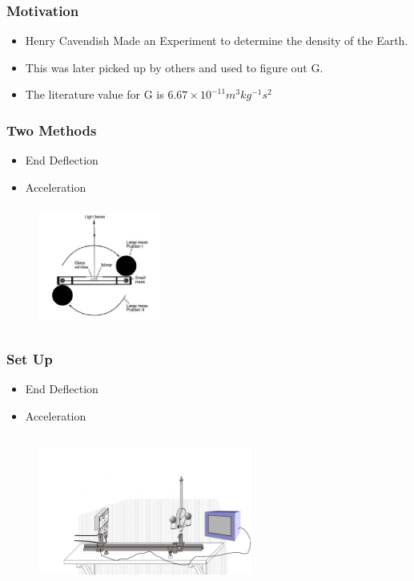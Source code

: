 \documentclass{beamer}
\begin{document}
\begin{frame}
\frametitle[Gravitational Constant]{Motivation}

   \begin{itemize}
   \item  Henry Cavendish Made an Experiment to determine the density of the Earth.
   \item  This was later picked up by others and used to figure out G.
   \item The literature value for G is ${6.67\times 10^{-11}}m^{3}kg^{-1}s^{2}$
   \end{itemize}
\end{frame}


\begin{frame}
\frametitle[Gravitational Constant]{Two Methods}

   \begin{itemize}
   \item  End Deflection
   \item  Acceleration
   \end{itemize}
   
   \centering
   \begin{figure}
\includegraphics[width=4cm, height=4cm]{images/cav2.png}
\label{fig:cab}
\end{figure}
\end{frame}

\begin{frame}
\frametitle[Gravitational Constant]{Set Up}

   \begin{itemize}
   \item  End Deflection
   \item  Acceleration
   \end{itemize}
   
   \centering
   \begin{figure}
\includegraphics[width=7cm, height=5cm]{images/edit.png}
\label{fig:cab}
\end{figure}
\end{frame}
\end{document}
